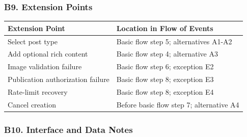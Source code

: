 \documentclass[12pt]{article}
\renewcommand{\baselinestretch}{1.5}
\begin{document}
\hypertarget{sec:b9-extension-points}{}
\subsubsection*{B9. Extension Points}
\par\medskip

\begingroup
\small
\renewcommand{\baselinestretch}{1.0}\selectfont
\renewcommand{\arraystretch}{1.15}
\setlength{\tabcolsep}{6pt}
\begin{longtable}{|>{\raggedright\arraybackslash}p{}|>{\raggedright\arraybackslash}p{}|}
\hline
\textbf{Extension Point} & \textbf{Location in Flow of Events} \\ \hline
\endhead
Select post type & Basic flow step 5; alternatives A1-A2 \\ \hline
Add optional rich content & Basic flow step 4; alternative A3 \\ \hline
Image validation failure & Basic flow step 6; exception E2 \\ \hline
Publication authorization failure & Basic flow step 8; exception E3 \\ \hline
Rate-limit recovery & Basic flow step 8; exception E4 \\ \hline
Cancel creation & Before basic flow step 7; alternative A4 \\ \hline
\end{longtable}
\endgroup
\par\medskip

\hypertarget{sec:b10-interface-and-data-notes}{}
\subsubsection*{B10. Interface and Data Notes}
\par\medskip
\end{document}
